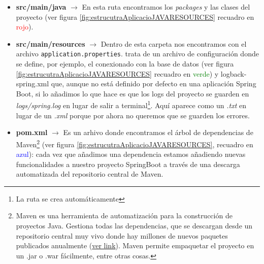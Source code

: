 \documentclass[a4paper,12pt]{report}
\begin{document}
				\vspace{-.9em}
				\begin{itemize}
					\setlength{\itemsep}{-.5em}
					\item \textbf{src/main/java} $\rightarrow$ En esta ruta encontramos los \textit{packages} y las clases del proyecto (ver figura \ref{fig:estrucutraAplicacioJAVARESOURCES} recuadro en \textcolor{red}{rojo}).
					\item \textbf{src/main/resources} $\rightarrow$ Dentro de esta carpeta  nos encontramos con el archivo \texttt{application.properties}. trata de un archivo de configuración donde se define, por ejemplo, el conexionado con la base de datos (ver figura \ref{fig:estrucutraAplicacioJAVARESOURCES} recuadro en \textcolor{green}{verde}) y logback-spring.xml que, aunque no está definido por defecto en una aplicación Spring Boot, si lo añadimos lo que hace es que los logs del proyecto se guarden en \textit{logs/spring.log} en lugar de salir a terminal\footnote{La ruta se crea automáticamente}. Aquí aparece como un \textit{.txt} en lugar de un \textit{.xml} porque por ahora no queremos que se guarden los errores.
					\item \textbf{pom.xml} $\rightarrow$ Es un arhivo donde encontramos el árbol de dependencias de Maven\footnote{Maven es una herramienta de automatización para la construcción de proyectos Java. Gestiona todas las dependencias, que se descargan desde un repositorio central muy vivo donde hay millones de nuevos paquetes publicados anualmente (\href{https://mvnrepository.com/repos/central}{ver link}). Maven permite empaquetar el proyecto en un .jar o .war fácilmente, entre otras cosas.} (ver figura \ref{fig:estrucutraAplicacioJAVARESOURCES}, recuadro en \textcolor{blue}{azul}): cada vez que añadimos una dependencia estamos añadiendo nuevas funcionalidades a nuestro proyecto SpringBoot a través de una descarga automatizada del repositorio central de Maven.
					
					
				\end{itemize}
				
\end{document}
